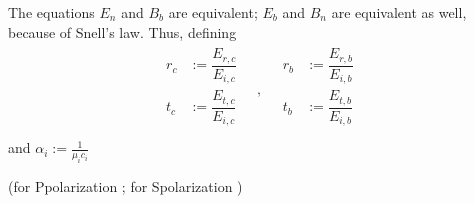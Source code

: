 \documentclass[letterpaper,10pt,italian]{jupyterBook}
\begin{document}
\sphinxAtStartPar
The equations \(E_n\) and \(B_b\) are equivalent; \(E_b\) and \(B_n\) are equivalent as well, because of Snell’s law. Thus, defining
\begin{equation*}
\begin{split}
\begin{aligned}
  r_c & := \dfrac{E_{r,c}}{E_{i,c}} \\
  t_c & := \dfrac{E_{t,c}}{E_{i,c}} \\
\end{aligned}
\quad , \quad
\begin{aligned}
  r_b & := \dfrac{E_{r,b}}{E_{i,b}} \\
  t_b & := \dfrac{E_{t,b}}{E_{i,b}} \\
\end{aligned}
\end{split}
\end{equation*}
\sphinxAtStartPar
and \(\alpha_i := \frac{1}{\mu_i c_i}\)

\sphinxAtStartPar
(for P\sphinxhyphen{}polarization  ; for S\sphinxhyphen{}polarization  )
\end{document}
